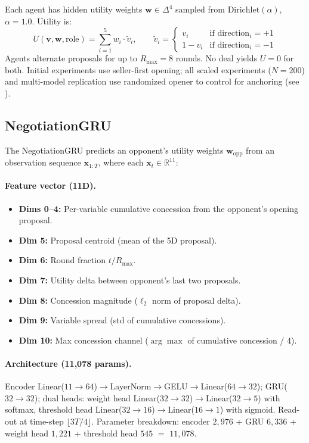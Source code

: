 \documentclass[11pt,a4paper]{article}
\begin{document}
Each agent has hidden utility weights $\mathbf{w} \in \Delta^4$ sampled from $\text{Dirichlet}(\alpha)$, $\alpha = 1.0$. Utility is:
\begin{equation}
U(\mathbf{v}, \mathbf{w}, \text{role}) = \sum_{i=1}^{5} w_i \cdot \tilde{v}_i, \qquad \tilde{v}_i = \begin{cases} v_i & \text{if direction}_i = +1 \\ 1 - v_i & \text{if direction}_i = -1 \end{cases}
\label{eq:utility}
\end{equation}
Agents alternate proposals for up to $R_{\max} = 8$ rounds. No deal yields $U = 0$ for both. Initial experiments use seller-first opening; all scaled experiments ($N = 200$) and multi-model replication use randomized opener to control for anchoring (see ).

\subsection{NegotiationGRU}
\label{sec:gru}

The NegotiationGRU predicts an opponent's utility weights $\hat{\mathbf{w}}_{\text{opp}}$ from an observation sequence $\mathbf{x}_{1:T}$, where each $\mathbf{x}_t \in \mathbb{R}^{11}$:

\paragraph{Feature vector (11D).}
\begin{itemize}
\item \textbf{Dims 0--4:} Per-variable cumulative concession from the opponent's opening proposal.
\item \textbf{Dim 5:} Proposal centroid (mean of the 5D proposal).
\item \textbf{Dim 6:} Round fraction $t / R_{\max}$.
\item \textbf{Dim 7:} Utility delta between opponent's last two proposals.
\item \textbf{Dim 8:} Concession magnitude ($\ell_2$ norm of proposal delta).
\item \textbf{Dim 9:} Variable spread (std of cumulative concessions).
\item \textbf{Dim 10:} Max concession channel ($\arg\max$ of cumulative concession / 4).
\end{itemize}

\paragraph{Architecture (11,078 params).}
Encoder Linear($11\!\to\!64$)$\to$LayerNorm$\to$GELU$\to$Linear($64\!\to\!32$); GRU($32\!\to\!32$); dual heads: weight head Linear($32\!\to\!32$)$\to$Linear($32\!\to\!5$) with softmax, threshold head Linear($32\!\to\!16$)$\to$Linear($16\!\to\!1$) with sigmoid. Read-out at time-step $\lfloor 3T/4 \rfloor$. Parameter breakdown: encoder $2{,}976$ + GRU $6{,}336$ + weight head $1{,}221$ + threshold head $545$ $=$ $11{,}078$.
\end{document}
